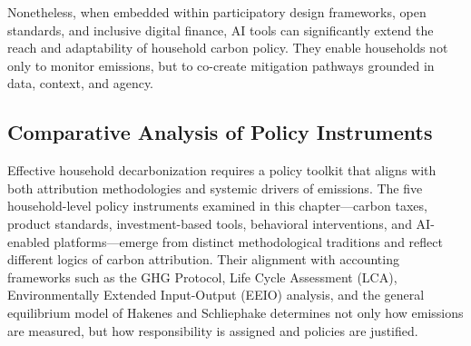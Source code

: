 \documentclass[12pt,a4paper]{article}%
\begin{document}
Nonetheless, when embedded within participatory design frameworks, open standards, and inclusive digital finance, AI tools can significantly extend the reach and adaptability of household carbon policy. They enable households not only to monitor emissions, but to co-create mitigation pathways grounded in data, context, and agency.

\subsection{Comparative Analysis of Policy Instruments}

Effective household decarbonization requires a policy toolkit that aligns with both attribution methodologies and systemic drivers of emissions. The five household-level policy instruments examined in this chapter—carbon taxes, product standards, investment-based tools, behavioral interventions, and AI-enabled platforms—emerge from distinct methodological traditions and reflect different logics of carbon attribution. Their alignment with accounting frameworks such as the GHG Protocol, Life Cycle Assessment (LCA), Environmentally Extended Input-Output (EEIO) analysis, and the general equilibrium model of Hakenes and Schliephake determines not only how emissions are measured, but how responsibility is assigned and policies are justified.
\end{document}
